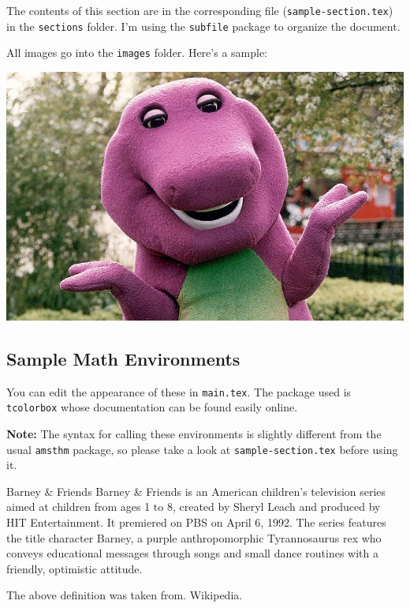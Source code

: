 \documentclass[../AAL-Notes.tex]{subfiles}
\begin{document}
The contents of this section are in the corresponding file (\texttt{sample-section.tex}) in the \texttt{sections} folder. I'm using the \texttt{subfile} package to organize the document.  

All images go into the \texttt{images} folder. Here's a sample:

\begin{center}
	\includegraphics[scale = 0.45]{images/barney}
\end{center}


\subsection{Sample Math Environments}
You can edit the appearance of these in \texttt{main.tex}. The package used is \texttt{tcolorbox} whose documentation can be found easily online.

\textbf{Note:} The syntax for calling these environments is slightly different from the usual \texttt{amsthm} package, so please take a look at \texttt{sample-section.tex} before using it.  

\begin{definition}{Barney \& Friends}{}
Barney \& Friends is an American children's television series aimed at children from ages 1 to 8, created by Sheryl Leach and produced by HIT Entertainment. It premiered on PBS on April 6, 1992. The series features the title character Barney, a purple anthropomorphic Tyrannosaurus rex who conveys educational messages through songs and small dance routines with a friendly, optimistic attitude.
\end{definition}

The above definition was taken from. Wikipedia.  
\end{document}
